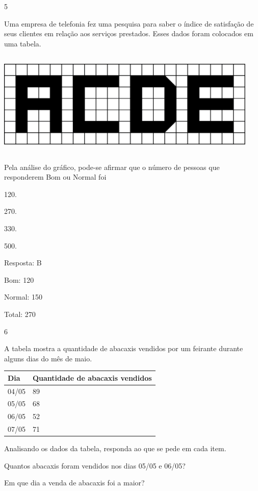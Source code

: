 {\begin{escolha}
{\num{5}

Uma empresa de telefonia fez uma pesquisa para saber o índice de
satisfação de seus clientes em relação aos serviços prestados. Esses dados foram
colocados em uma tabela.


\includegraphics[width=4.92543in,height=1.97517in]{media/image96.png}

Pela análise do gráfico, pode-se afirmar que o número de pessoas que
responderem Bom ou Normal foi

\begin{escolha}
\item
  120.
\item
  270.
\item
  330.
\item
  500.
\end{escolha}

Resposta: B

Bom: 120

Normal: 150

Total: 270

\num{6}

A tabela mostra a quantidade de abacaxis vendidos por um feirante
durante alguns dias do mês de maio.

\begin{longtable}[]{@{}ll@{}}
\toprule
Dia & Quantidade de abacaxis vendidos\tabularnewline
\midrule
\endhead
04/05 & 89\tabularnewline
05/05 & 68\tabularnewline
06/05 & 52\tabularnewline
07/05 & 71\tabularnewline
\bottomrule
\end{longtable}

Analisando os dados da tabela, responda ao que se pede em cada item.

\begin{escolha}
  \item
  Quantos abacaxis foram vendidos nos dias 05/05 e 06/05?

\item
  Em que dia a venda de abacaxis foi a maior?


\end{escolha}}
\end{escolha}}
